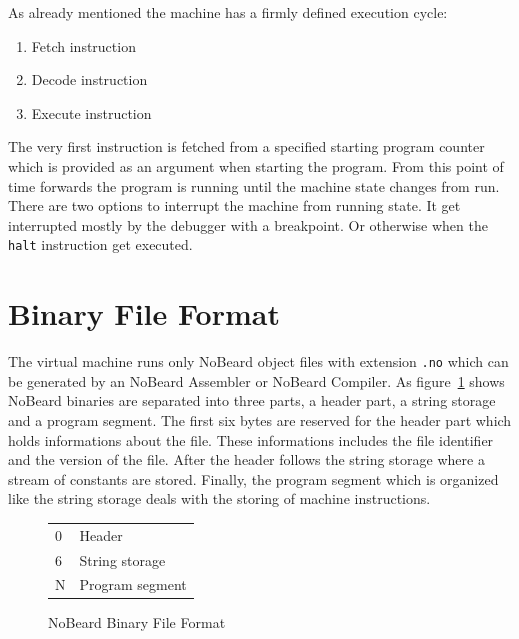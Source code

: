 As already mentioned the machine has a firmly defined execution cycle:
\begin{enumerate}
\item Fetch instruction
\item Decode instruction
\item Execute instruction
\end{enumerate}
The very first instruction is fetched from a specified starting program counter which is provided as an argument when starting the program. From this point of time forwards the program is running until the machine state changes from run. There are two options to interrupt the machine from running state. It get interrupted mostly by the debugger with a breakpoint. Or otherwise when the \lstinline$halt$ instruction get executed.

\section{Binary File Format}
The virtual machine runs only NoBeard object files with extension \lstinline$.no$ which can be generated by an NoBeard Assembler or NoBeard Compiler. As figure~\ref{fig:binaryfileformat} shows NoBeard binaries are separated into three parts, a header part, a string storage and a program segment.
The first six bytes are reserved for the header part which holds informations about the file. These informations includes the file identifier and the version of the file. After the header follows the string storage where a stream of constants are stored. Finally, the program segment which is organized like the string storage deals with the storing of machine instructions. 
\begin{figure}[h]
\begin{center}
\begin{tabular}{p{1em}|p{10em}|}
\cline{2-2}
\parbox[c][3em][t]{1em}{\hfill 0} & Header \\ 
\parbox[c][4em][t]{1em}{\hfill 6} & String storage \\ 
\parbox[c][5em][b]{1em}{\hfill N} & Program segment \\ 
\end{tabular}
\end{center}
\caption{NoBeard Binary File Format}\label{fig:binaryfileformat}
\end{figure}

